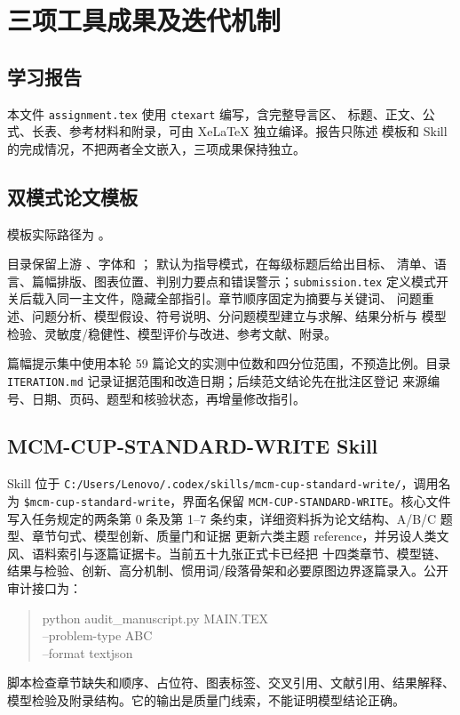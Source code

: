 \documentclass[UTF8,a4paper,12pt]{ctexart}
\begin{document}
\section{三项工具成果及迭代机制}

\subsection{学习报告}

本文件 \texttt{assignment.tex} 使用 \texttt{ctexart} 编写，含完整导言区、
标题、正文、公式、长表、参考材料和附录，可由 XeLaTeX 独立编译。报告只陈述
模板和 Skill 的完成情况，不把两者全文嵌入，三项成果保持独立。

\subsection{双模式论文模板}

模板实际路径为 。\par
目录保留上游
、字体和
； 默认为指导模式，在每级标题后给出目标、
清单、语言、篇幅排版、图表位置、判别力要点和错误警示；\texttt{submission.tex}
定义模式开关后载入同一主文件，隐藏全部指引。章节顺序固定为摘要与关键词、
问题重述、问题分析、模型假设、符号说明、分问题模型建立与求解、结果分析与
模型检验、灵敏度/稳健性、模型评价与改进、参考文献、附录。

篇幅提示集中使用本轮 59 篇论文的实测中位数和四分位范围，不预造比例。目录
\texttt{ITERATION.md} 记录证据范围和改造日期；后续范文结论先在批注区登记
来源编号、日期、页码、题型和核验状态，再增量修改指引。

\subsection{MCM-CUP-STANDARD-WRITE Skill}

Skill 位于
\texttt{C:/Users/Lenovo/.codex/skills/mcm-cup-standard-write/}，调用名为
\texttt{\$mcm-cup-standard-write}，界面名保留
\texttt{MCM-CUP-STANDARD-WRITE}。核心文件写入任务规定的两条第 0 条及第 1--7
条约束，详细资料拆为论文结构、A/B/C 题型、章节句式、模型创新、质量门和证据
更新六类主题 reference，并另设人类文风、语料索引与逐篇证据卡。当前五十九张正式卡已经把
十四类章节、模型链、结果与检验、创新、高分机制、惯用词/段落骨架和必要原图边界逐篇录入。公开审计接口为：
\begin{quote}
\small\ttfamily
python audit\_manuscript.py MAIN.TEX\\
\hspace*{1em}--problem-type A\textbar B\textbar C\\
\hspace*{1em}--format text\textbar json
\end{quote}
脚本检查章节缺失和顺序、占位符、图表标签、交叉引用、文献引用、结果解释、
模型检验及附录结构。它的输出是质量门线索，不能证明模型结论正确。
\end{document}
